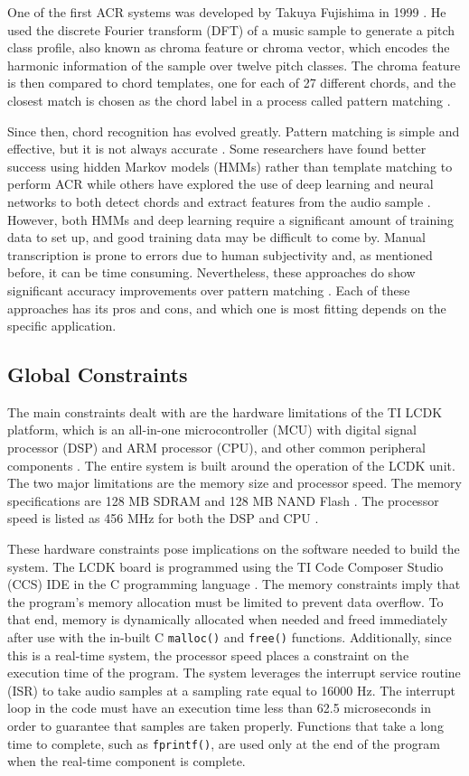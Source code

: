 \documentclass[journal]{IEEEtran}
\begin{document}
One of the first ACR systems was developed by Takuya Fujishima in 1999 \cite{pauwels}.
He used the discrete Fourier transform (DFT) of a music sample to generate a pitch class profile, also known as chroma feature or chroma vector, which encodes the harmonic information of the sample over twelve pitch classes.
The chroma feature is then compared to chord templates, one for each of 27 different chords, and the closest match is chosen as the chord label in a process called pattern matching \cite{fujishima}.

Since then, chord recognition has evolved greatly.
Pattern matching is simple and effective, but it is not always accurate \cite{jiang}.
Some researchers have found better success using hidden Markov models (HMMs) rather than template matching to perform ACR \cite{sheh} while others have explored the use of deep learning and neural networks to both detect chords \cite{boulanger} and extract features from the audio sample \cite{korzeniowski}.
However, both HMMs and deep learning require a significant amount of training data to set up, and good training data may be difficult to come by.
Manual transcription is prone to errors due to human subjectivity \cite{pauwels} and, as mentioned before, it can be time consuming.
Nevertheless, these approaches do show significant accuracy improvements over pattern matching \cite{jiang, boulanger}.
Each of these approaches has its pros and cons, and which one is most fitting depends on the specific application.


\subsection{Global Constraints}
The main constraints dealt with are the hardware limitations of the TI LCDK platform, which is an all-in-one microcontroller (MCU) with digital signal processor (DSP) and ARM processor (CPU), and other common peripheral components \cite{lcdk}.
The entire system is built around the operation of the LCDK unit.
The two major limitations are the memory size and processor speed.
The memory specifications are 128 MB SDRAM and 128 MB NAND Flash \cite{lcdk}.
The processor speed is listed as 456 MHz for both the DSP and CPU \cite{lcdk}.

These hardware constraints pose implications on the software needed to build the system.
The LCDK board is programmed using the TI Code Composer Studio (CCS) IDE in the C programming language \cite{lcdk}.
The memory constraints imply that the program’s memory allocation must be limited to prevent data overflow.
To that end, memory is dynamically allocated when needed and freed immediately after use with the in-built C \texttt{malloc()} and \texttt{free()} functions.
Additionally, since this is a real-time system, the processor speed places a constraint on the execution time of the program.
The system leverages the interrupt service routine (ISR) to take audio samples at a sampling rate equal to 16000 Hz.
The interrupt loop in the code must have an execution time less than 62.5 microseconds in order to guarantee that samples are taken properly.
Functions that take a long time to complete, such as \texttt{fprintf()}, are used only at the end of the program when the real-time component is complete.
\end{document}
